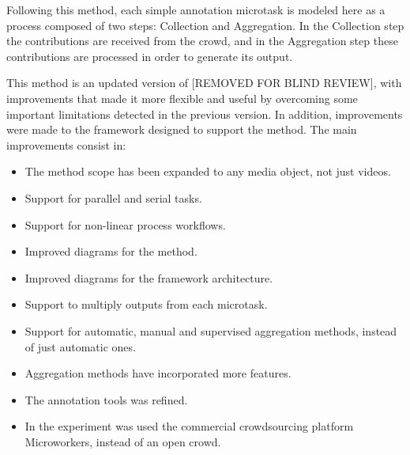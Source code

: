 Following this method, each simple annotation microtask is modeled here as a process composed of two steps: Collection and Aggregation. In the Collection step the contributions are received from the crowd, and in the Aggregation step these contributions are processed in order to generate its output.



This method is an updated version of [REMOVED FOR BLIND REVIEW]\citep{172450}, with improvements that made it more flexible and useful by overcoming some important limitations detected in the previous version. In addition, improvements were made to the framework designed to support the method. The main improvements consist in:
\begin{itemize}

\item The method scope has been expanded to any media object, not just videos.

\item Support for parallel and serial tasks.

\item Support for non-linear process workflows.

\item Improved diagrams for the method.

\item Improved diagrams for the framework architecture.

\item Support to multiply outputs from each microtask.

\item Support for automatic, manual and supervised aggregation methods, instead of just automatic ones.

\item Aggregation methods have incorporated more features.

\item The annotation tools was refined.

\item In the experiment was used the commercial crowdsourcing platform Microworkers, instead of an open crowd.

\end{itemize}

